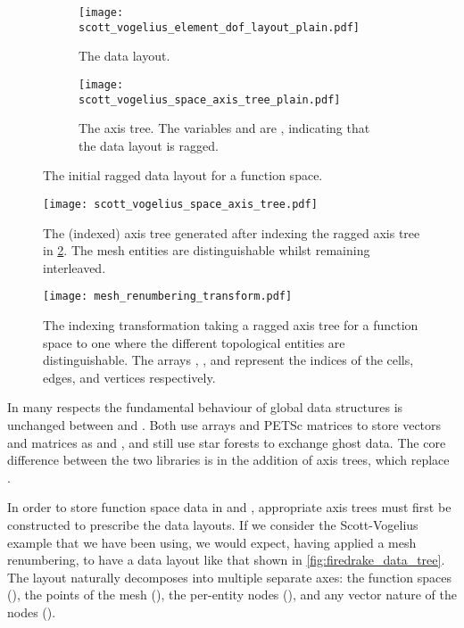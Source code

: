\documentclass[thesis]{subfiles}
\begin{document}
\begin{figure}
  \centering
  \begin{subfigure}{\textwidth}
    \centering
    \texttt{[image: scott\_vogelius\_element\_dof\_layout\_plain.pdf]}
    \caption{
      The data layout.
    }
    \label{fig:firedrake_data_tree_plain}
  \end{subfigure}

  \vspace{1em}

  \begin{subfigure}{\textwidth}
    \centering
    \texttt{[image: scott\_vogelius\_space\_axis\_tree\_plain.pdf]}
    \caption{
      The axis tree.
      The variables  and  are  , indicating that the data layout is ragged.
    }
    \label{fig:firedrake_axis_tree_plain}
  \end{subfigure}
  \caption{
    The initial ragged data layout for a function space.
  }
  \label{fig:firedrake_plain}
\end{figure}

\begin{figure}
  \centering
  \texttt{[image: scott\_vogelius\_space\_axis\_tree.pdf]}
  \caption{
    The (indexed) axis tree generated after indexing the ragged axis tree in \cref{fig:firedrake_axis_tree_plain}.
    The mesh entities are distinguishable whilst remaining interleaved.
  }
  \label{fig:firedrake_axis_tree}
\end{figure}

\begin{figure}
  \centering
  \texttt{[image: mesh\_renumbering\_transform.pdf]}
  \caption{
    The indexing transformation taking a ragged axis tree for a function space to one where the different topological entities are distinguishable.
    The arrays \pycode{[0,3,...]}, \pycode{[2,...]}, and \pycode{[1,4,...]} represent the indices of the cells, edges, and vertices respectively.
  }
  \label{fig:mesh_renumbering_transform}
\end{figure}

In many respects the fundamental behaviour of global data structures is unchanged between  and .
Both use \numpy arrays and PETSc matrices to store vectors and matrices as  and , and  still use star forests to exchange ghost data.
The core difference between the two libraries is in the addition of axis trees, which replace  .

In order to store function space data in   and , appropriate axis trees must first be constructed to prescribe the data layouts.
If we consider the Scott-Vogelius example that we have been using, we would expect, having applied a mesh renumbering, to have a data layout like that shown in \cref{fig:firedrake_data_tree}.
The layout naturally decomposes into multiple separate axes: the function spaces (), the points of the mesh (), the per-entity nodes (), and any vector nature of the nodes ().
\end{document}
